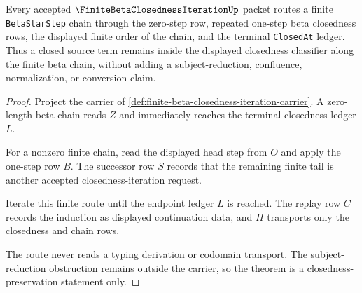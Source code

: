 \begin{theorem}
\label{thm:finite-beta-closedness-iteration-route}
Every accepted $\FiniteBetaClosednessIterationUp$ packet routes a finite \texttt{BetaStarStep} chain through the zero-step row, repeated one-step beta closedness rows, the displayed finite order of the chain, and the terminal \texttt{ClosedAt} ledger. Thus a closed source term remains inside the displayed closedness classifier along the finite beta chain, without adding a subject-reduction, confluence, normalization, or conversion claim.
\end{theorem}
\begin{proof}
Project the carrier of \autoref{def:finite-beta-closedness-iteration-carrier}. A zero-length beta chain reads $Z$ and immediately reaches the terminal closedness ledger $L$.

For a nonzero finite chain, read the displayed head step from $O$ and apply the one-step row $B$. The successor row $S$ records that the remaining finite tail is another accepted closedness-iteration request.

Iterate this finite route until the endpoint ledger $L$ is reached. The replay row $C$ records the induction as displayed continuation data, and $H$ transports only the closedness and chain rows.

The route never reads a typing derivation or codomain transport. The subject-reduction obstruction remains outside the carrier, so the theorem is a closedness-preservation statement only.
\end{proof}

